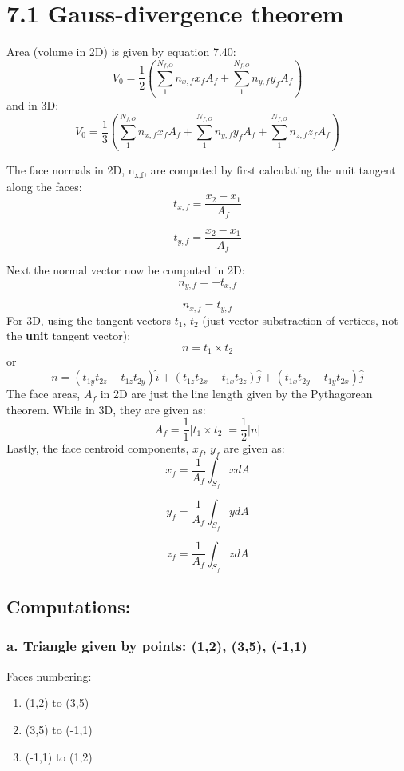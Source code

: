 \documentclass[11pt]{article}
\author{mike}
\date{\today}
\title{}
\begin{document}
\tableofcontents

\section{7.1 Gauss-divergence theorem}
\label{sec:org577de4b}
Area (volume in 2D) is given by equation 7.40:
\[
V_{0}=\frac{1}{2} \left( \sum_{1}^{N_{f,O}} n_{x,f}x_{f}A_{f} + \sum_{1}^{N_{f,O}} n_{y,f}y_{f}A_{f} \right)
\]
and in 3D:
\[
V_{0}=\frac{1}{3} \left( \sum_{1}^{N_{f,O}} n_{x,f}x_{f}A_{f} + \sum_{1}^{N_{f,O}} n_{y,f}y_{f}A_{f} + \sum_{1}^{N_{f,O}} n_{z,f}z_{f}A_{f} \right)
\]


The face normals in 2D, n\(_{\text{x,f}}\), are computed by first calculating the unit tangent along the faces:
\[
t_{x,f}=\frac{x_{2}-x_{1}}{A_{f}}
\]

\[
t_{y,f}=\frac{x_{2}-x_{1}}{A_{f}}
\]

Next the normal vector now be computed in 2D:
\[
n_{y,f} = -t_{x,f}
\]

\[
n_{x,f} = t_{y,f}
\]
For 3D, using the tangent vectors \(t_{1}\), \(t_{2}\) (just vector substraction of vertices, not the \textbf{unit} tangent vector):
\[
n = t_{1} \times t_{2}
\]
or 
\[
n=(t_{1y}t_{2z} -t_{1z}t_{2y}) \hat{i} + (t_{1z}t_{2x} -t_{1x}t_{2z}) \hat{j} + (t_{1x}t_{2y} -t_{1y}t_{2x}) \hat{j}
\]
The face areas, \(A_{f}\) in 2D are just the line length given by the Pythagorean theorem. While in 3D, they are given as:
\[
A_{f} = \frac{1}{1} |t_{1} \times t_{2}| = \frac{1}{2} |n|
\]
Lastly, the face centroid components, \(x_{f}\), \(y_{f}\) are given as:
\[
x_{f}=\frac{1}{A_{f}} \int_{S_{f}} x dA
\]

\[
y_{f}=\frac{1}{A_{f}} \int_{S_{f}} y dA
\]

\[
z_{f}=\frac{1}{A_{f}} \int_{S_{f}} z dA
\]



\subsection{Computations:}
\label{sec:org74c94ea}
\subsubsection{a. Triangle given by points: (1,2), (3,5), (-1,1)}
\label{sec:org979675f}

Faces numbering:
\begin{enumerate}
\item (1,2) to (3,5)
\item (3,5) to (-1,1)
\item (-1,1) to (1,2)
\end{enumerate}
\end{document}
